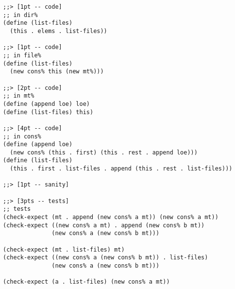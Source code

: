 \documentclass[12pt]{article}                   %
\newenvironment{solution}{}{}
\begin{document}
\begin{problem}
\begin{solution}
\begin{verbatim}
;;> [1pt -- code]
;; in dir%
(define (list-files)
  (this . elems . list-files))

;;> [1pt -- code]
;; in file%
(define (list-files)
  (new cons% this (new mt%)))

;;> [2pt -- code]
;; in mt%
(define (append loe) loe)
(define (list-files) this)

;;> [4pt -- code]
;; in cons%
(define (append loe)
  (new cons% (this . first) (this . rest . append loe)))
(define (list-files)
  (this . first . list-files . append (this . rest . list-files)))

;;> [1pt -- sanity]

;;> [3pts -- tests]
;; tests
(check-expect (mt . append (new cons% a mt)) (new cons% a mt))
(check-expect ((new cons% a mt) . append (new cons% b mt))
              (new cons% a (new cons% b mt)))

(check-expect (mt . list-files) mt)
(check-expect ((new cons% a (new cons% b mt)) . list-files)
              (new cons% a (new cons% b mt)))

(check-expect (a . list-files) (new cons% a mt))
\end{verbatim}
\end{solution}

\end{problem}
\newpage
\end{document}
